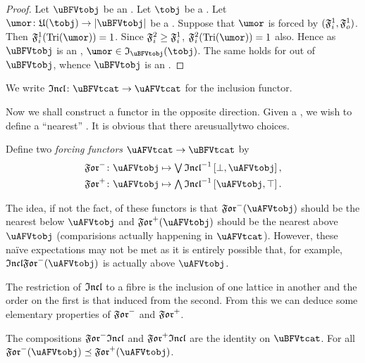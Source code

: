 \documentclass[%
12pt,%
arxiv,%
defaults
]{myclass}
\begin{document}
\begin{proof}
Let \(\uBFVtobj\) be an \uBFVtobjalt.
Let \(\tobj\) be a \tobj.
Let \(\umor \colon \ufunc(\tobj) \to \forfunc[\uBFVtobj]\) be a \umor.
Suppose that \(\umor\) is forced by \((\iforce^1, \oforce^1)\).
Then \(\iforce^1(\trials{\umor}) = 1\).
Since \(\iforce^2 \ge \iforce^1\), \(\iforce^2(\trials{\umor}) = 1\) also.
Hence as \(\uBFVtobj\) is an \uBFVtobjalt, \(\umor \in \itest_{\uBFVtobj}(\tobj)\).
The same holds for \umors out of \(\uBFVtobj\), whence \(\uBFVtobj\) is an \uAFVtobjalt.
\end{proof}

\begin{defn}
We write \(\incfunc \colon \uBFVtcat \to \uAFVtcat\) for the inclusion functor.
\end{defn}

Now we shall construct a functor in the opposite direction.
Given a \uAFVtobjalt, we wish to define a ``nearest'' \uBFVtobjalt.
It is obvious that there are\emhyp{}usually\emhyp{}two choices.

\begin{defn}
Define two \emph{forcing functors} \(\uAFVtcat \to \uBFVtcat\) by
%
\begin{align*}
\Jforfunc \colon \uAFVtobj &\mapsto \join \incfunc^{-1} \left[\bot, \uAFVtobj\right], \\
%
\Mforfunc \colon \uAFVtobj & \mapsto \meet \incfunc^{-1} \left[\uAFVtobj, \top\right].
\end{align*}
\end{defn}

The idea, if not the fact, of these functors is that \(\Jforfunc(\uAFVtobj)\) should be the nearest \uBFVtobjalt below \(\uAFVtobj\) and \(\Mforfunc(\uAFVtobj)\) should be the nearest \uBFVtobjalt above \(\uAFVtobj\) (comparisions actually happening in \(\uAFVtcat\)).
However, these na\"ive expectations may not be met as it is entirely possible that, for example, \(\incfunc\Jforfunc(\uAFVtobj)\) is actually above \(\uAFVtobj\).

The restriction of \(\incfunc\) to a fibre is the inclusion of one lattice in another and the order on the first is that induced from the second.
From this we can deduce some elementary properties of \(\Jforfunc\) and \(\Mforfunc\).

\begin{lemma}
The compositions \(\Jforfunc\incfunc\) and \(\Mforfunc\incfunc\) are the identity on \(\uBFVtcat\).
For all \uAFVtobjalts[\uAFVtobj] \(\Jforfunc(\uAFVtobj) \preceq \Mforfunc(\uAFVtobj)\).
\end{lemma}
\end{document}

